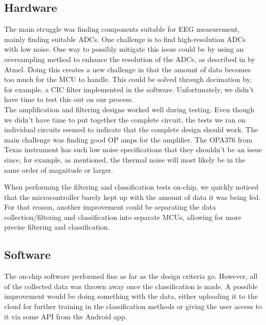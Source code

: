 \subsection{Hardware}
The main struggle was finding components suitable for EEG measurement, mainly finding suitable ADCs. One challenge is to find high-resolution ADCs with low noise. One way to possibly mitigate this issue could be by using an oversampling method to enhance the resolution of the ADCs, as described in \cite{AtmelDeci} by Atmel. Doing this creates a new challenge in that the amount of data becomes too much for the MCU to handle. This could be solved through decimation by, for example, a CIC filter implemented in the software. Unfortunately, we didn't have time to test this out on our process.\\

The amplification and filtering designs worked well during testing. Even though we didn't have time to put together the complete circuit, the tests we ran on individual circuits seemed to indicate that the complete design should work. The main challenge was finding good OP amps for the amplifier. The OPA376 from Texas instrument has such low noise specifications that they shouldn't be an issue since, for example, as mentioned, the thermal noise will most likely be in the same order of magnitude or larger. 

When performing the filtering and classification tests on-chip, we quickly noticed that the microcontroller barely kept up with the amount of data it was being fed. For that reason, another improvement could be separating the data collection/filtering and classification into separate MCUs, allowing for more precise filtering and classification.

\subsection{Software}
The on-chip software performed fine as far as the design criteria go. However, all of the collected data was thrown away once the classification is made. A possible improvement would be doing something with the data, either uploading it to the cloud for further training in the classification methods or giving the user access to it via some API from the Android app.
